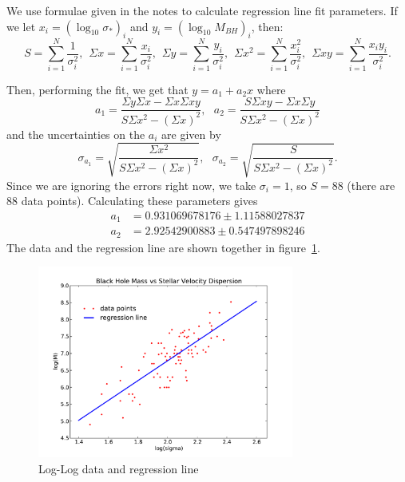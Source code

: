 \documentclass[11pt,letterpaper]{article}
\begin{document}
We use formulae given in the notes to calculate 
regression line fit parameters. If we let $ x_i = (\log_{10} \sigma_{*})_i$ 
and $ y_i = (\log_{10}M_{BH})_i$, then:
$$ S = \sum\limits_{i=1}^{N} \frac{1}{\sigma_i^2}, \hspace{5pt} \Sigma x = 
\sum\limits_{i=1}^{N} \frac{x_i}{\sigma_i^2}, \hspace{5pt} \Sigma y = 
\sum\limits_{i=1}^{N} \frac{y_i}{\sigma_i^2}, \hspace{5pt} \Sigma x^2 = 
\sum\limits_{i=1}^{N} \frac{x_i^2}{\sigma_i^2}, \hspace{5pt} \Sigma xy = 
\sum\limits_{i=1}^{N} \frac{x_i y_i}{\sigma_i^2}. $$

Then, performing the fit, we get that $y = a_1 + a_2 x$ where
$$ a_1 = \frac{\Sigma y \Sigma x - \Sigma x \Sigma xy}{S\Sigma x^2 - (\Sigma x)^2},
\hspace{8pt} 
a_2 = \frac{S \Sigma xy - \Sigma x \Sigma y}{S\Sigma x^2 - (\Sigma x)^2} $$
and the uncertainties on the $a_i$ are given by
$$ \sigma_{a_1} = \sqrt{\frac{\Sigma x^2}{S\Sigma x^2 - (\Sigma x)^2}},
\hspace{8pt}
\sigma_{a_2} = \sqrt{\frac{S}{S\Sigma x^2 - (\Sigma x)^2}}.$$
Since we are ignoring the errors right now, we take $\sigma_i = 1$, 
so $S = 88$ (there are 88 data points). Calculating these parameters gives
\begin{align*}
a_1 &= 0.931069678176 \pm 1.11588027837 \\
a_2 &= 2.92542900883 \pm 0.547497898246
\end{align*}
The data and the regression line are shown together in figure~\ref{fig:5b}. 

\begin{figure}[bth]
\centering
\includegraphics[width=0.75\textwidth]{ws5-b.pdf}
\caption{Log-Log data and regression line}
\label{fig:5b}
\end{figure}
\end{document}
